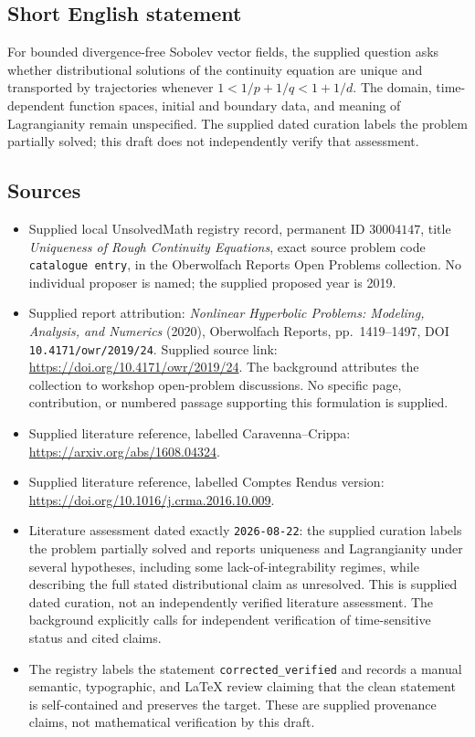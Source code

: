 \documentclass[11pt]{article}
\begin{document}
\subsection{Short English statement}
For bounded divergence-free Sobolev vector fields, the supplied question asks whether distributional solutions of the continuity equation are unique and transported by trajectories whenever \(1<1/p+1/q<1+1/d\). The domain, time-dependent function spaces, initial and boundary data, and meaning of Lagrangianity remain unspecified. The supplied dated curation labels the problem partially solved; this draft does not independently verify that assessment.
\subsection{Sources}
\begin{itemize}
\item Supplied local UnsolvedMath registry record, permanent ID \(30004147\), title \emph{Uniqueness of Rough Continuity Equations}, exact source problem code \texttt{catalogue entry}, in the Oberwolfach Reports Open Problems collection. No individual proposer is named; the supplied proposed year is 2019.
\item Supplied report attribution: \emph{Nonlinear Hyperbolic Problems: Modeling, Analysis, and Numerics} (2020), Oberwolfach Reports, pp.\ 1419--1497, DOI \texttt{10.4171/owr/2019/24}. Supplied source link: \url{https://doi.org/10.4171/owr/2019/24}. The background attributes the collection to workshop open-problem discussions. No specific page, contribution, or numbered passage supporting this formulation is supplied.
\item Supplied literature reference, labelled Caravenna--Crippa: \url{https://arxiv.org/abs/1608.04324}.
\item Supplied literature reference, labelled Comptes Rendus version: \url{https://doi.org/10.1016/j.crma.2016.10.009}.
\item Literature assessment dated exactly \texttt{2026-08-22}: the supplied curation labels the problem partially solved and reports uniqueness and Lagrangianity under several hypotheses, including some lack-of-integrability regimes, while describing the full stated distributional claim as unresolved. This is supplied dated curation, not an independently verified literature assessment. The background explicitly calls for independent verification of time-sensitive status and cited claims.
\item The registry labels the statement \texttt{corrected\_verified} and records a manual semantic, typographic, and LaTeX review claiming that the clean statement is self-contained and preserves the target. These are supplied provenance claims, not mathematical verification by this draft.
\end{itemize}
\end{document}
